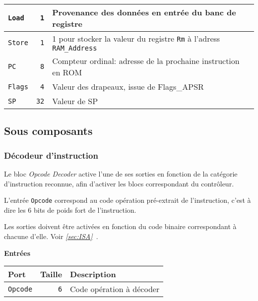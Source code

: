 \documentclass{article}
\begin{document}
\begin{tabular}{|l|r|l|}
        \hline
        \texttt{Load}         & \texttt{1}      & Provenance des données en entrée du banc de registre                                               \\
        \hline
        \texttt{Store}        & \texttt{1}      & 1 pour stocker la valeur du registre \texttt{Rm} à l'adress \texttt{RAM\_Address}                  \\
        \hline
        \texttt{PC}           & \texttt{8}      & Compteur ordinal: adresse de la prochaine instruction en ROM                                       \\
        \hline
\texttt{Flags}    & \texttt{4}          & Valeur des drapeaux, issue de Flags_APSR \\
        \hline
        \texttt{SP}    & \texttt{32}          & Valeur de SP \\

        

        \hline
    \end{tabular}

    \subsection{Sous composants}

    \subsubsection{Décodeur d'instruction}
    \label{sec:OpDec}


    Le bloc \textit{Opcode Decoder} active l'une de ses sorties en fonction de la catégorie d'instruction reconnue, afin d'activer les blocs correspondant du contrôleur.

    L'entrée \texttt{Opcode} correspond au code opération pré-extrait de l'instruction, c'est à dire les 6 bits de poids fort de l'instruction.

    Les sorties doivent être activées en fonction du code binaire correspondant à chacune d'elle.
    Voir \textit{\ref{sec:ISA}~}.


    \textbf{Entrées}\\

    \begin{tabular}{|l|r|l|}
        \hline
        \textbf{Port}   & \textbf{Taille} & \textbf{Description}     \\
        \hline

        \texttt{Opcode} & \texttt{6}      & Code opération à décoder \\

        \hline
    \end{tabular}
\end{document}
